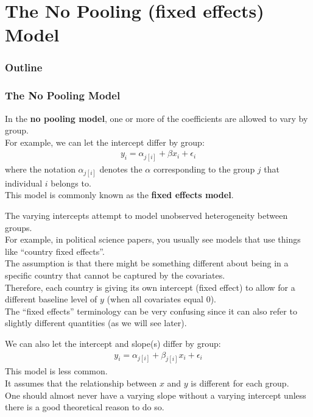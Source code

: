 \documentclass[handout]{beamer}
\begin{document}
\section{The No Pooling (fixed effects) Model}

\begin{frame}
\frametitle{Outline}
\tableofcontents[currentsection]
\end{frame}


\begin{frame}
\frametitle{The No Pooling Model}
In the \textbf{no pooling model}, one or more of the coefficients are
allowed to vary by group.  \\
\pause
\bigskip
For example, we can let the intercept differ by group:
\begin{eqnarray*}
y_i = \alpha_{j[i]} + \beta x_i + \epsilon_i
\end{eqnarray*} 
where the notation $\alpha_{j[i]}$ denotes the $\alpha$ corresponding
to the group $j$ that individual $i$ belongs to.\\
\pause
\bigskip
This model is commonly known as the \textbf{fixed effects model}.\\
\end{frame}

\begin{frame}
The varying intercepts attempt to model unobserved heterogeneity
between groups.\\
\pause
\bigskip
For example, in political science papers, you usually see models that
use things like ``country fixed effects''.\\
\pause
\bigskip
The assumption is that there might be something different about being
in a specific country that cannot be captured by the covariates.\\
\pause
\bigskip
Therefore, each country is giving its own intercept (fixed effect) to
allow for a different baseline level of $y$ (when all covariates equal
0).\\
\pause
\bigskip
The ``fixed effects'' terminology can be very confusing since it can
also refer to slightly different quantities (as we will see later).
\end{frame}


\begin{frame}
We can also let the intercept and slope(s) differ by group:
\begin{eqnarray*}
y_i = \alpha_{j[i]} + \beta_{j[i]} x_i + \epsilon_i
\end{eqnarray*} 
\pause
This model is less common.\\
\bigskip
\pause
It assumes that the relationship between $x$ and $y$ is different for
each group.\\
\bigskip
\pause
One should almost never have a varying slope without a varying
intercept unless there is a good theoretical reason to do so.
\end{frame}
\end{document}
